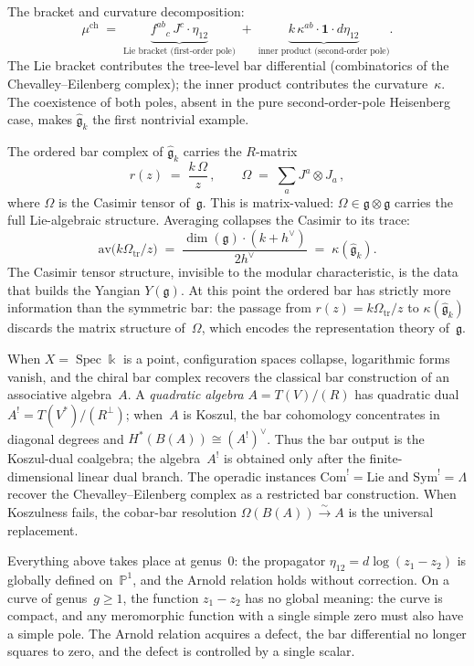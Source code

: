 The bracket and curvature decomposition:
\[
\mu^{\mathrm{ch}}
\;=\;
\underbrace{f^{ab}{}_{c}\,J^c\cdot\eta_{12}}_{\text{Lie bracket
(first-order pole)}}
\;+\;
\underbrace{k\,\kappa^{ab}\cdot\mathbf 1\cdot
d\eta_{12}}_{\text{inner product (second-order pole)}}.
\]
The Lie bracket contributes the tree-level bar differential
(combinatorics of the Chevalley--Eilenberg complex); the inner
product contributes the curvature~$\kappa$. The coexistence of
both poles, absent in the pure second-order-pole Heisenberg case,
makes $\widehat{\mathfrak g}_k$ the first nontrivial example.

The ordered bar complex of $\widehat{\mathfrak g}_k$ carries the $R$-matrix
\[
r(z) \;=\; \frac{k\,\Omega}{z}\,,
\qquad
\Omega \;=\; \sum_a J^a \otimes J_a\,,
\]
where $\Omega$ is the Casimir tensor of~$\mathfrak g$. This is
matrix-valued: $\Omega \in \mathfrak g \otimes \mathfrak g$
carries the full Lie-algebraic structure. Averaging collapses the
Casimir to its trace:
\[
\mathrm{av}\bigl(k\Omega_{\mathrm{tr}}/z\bigr)
\;=\;
\frac{\dim(\mathfrak g)\cdot(k+h^\vee)}{2h^\vee}
\;=\;
\kappa(\widehat{\mathfrak g}_k).
\]
The Casimir tensor structure, invisible to the modular characteristic,
is the data that builds the Yangian $Y(\mathfrak g)$. At this point
the ordered bar has strictly more information than the symmetric bar:
the passage from $r(z)=k\Omega_{\mathrm{tr}}/z$ to $\kappa(\widehat{\mathfrak g}_k)$
discards the matrix structure of~$\Omega$, which encodes the representation
theory of~$\mathfrak g$.

\begin{remark}\label{rem:pf1-zero-dim}
When $X=\operatorname{Spec}\Bbbk$ is a point, configuration spaces
collapse, logarithmic forms vanish, and the chiral bar complex
recovers the classical bar construction of an associative
algebra~$A$. A \emph{quadratic algebra} $A=T(V)/(R)$ has quadratic
dual $A^!=T(V^*)/(R^\perp)$; when~$A$ is Koszul, the bar
cohomology concentrates in diagonal degrees and
$H^*(B(A))\cong(A^!)^\vee$. Thus the bar output is the
Koszul-dual coalgebra; the algebra~$A^!$ is obtained only after the
finite-dimensional linear dual branch. The operadic instances
$\mathrm{Com}^!=\mathrm{Lie}$ and $\mathrm{Sym}^!=\Lambda$ recover
the Chevalley--Eilenberg complex as a restricted bar construction.
When Koszulness fails, the cobar-bar resolution
$\Omega(B(A))\xrightarrow{\sim}A$ is the universal replacement.
\end{remark}

Everything above takes place at genus~$0$: the propagator
$\eta_{12}=d\log(z_1-z_2)$ is globally defined on~$\mathbb P^1$,
and the Arnold relation holds without correction. On a curve of
genus~$g \geq 1$, the function $z_1 - z_2$ has no global meaning:
the curve is compact, and any meromorphic function with a single
simple zero must also have a simple pole. The Arnold relation
acquires a defect, the bar differential no longer squares to zero,
and the defect is controlled by a single scalar.

